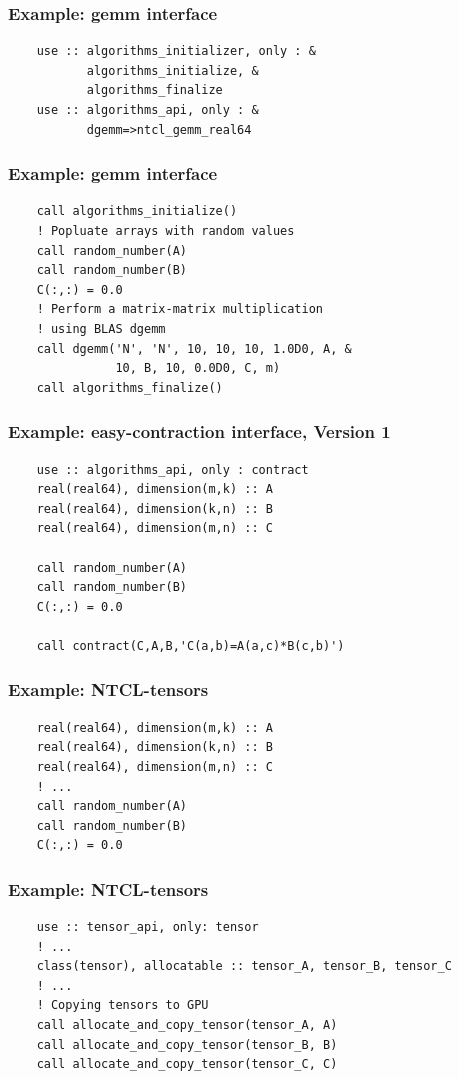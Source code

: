 \begin{frame}[fragile]
	\frametitle{Example: gemm interface}
	\begin{lstlisting}
    use :: algorithms_initializer, only : &
           algorithms_initialize, &
           algorithms_finalize
    use :: algorithms_api, only : &
           dgemm=>ntcl_gemm_real64
	\end{lstlisting}
\end{frame}

\begin{frame}[fragile]
	\frametitle{Example: gemm interface}
	\begin{lstlisting}
    call algorithms_initialize()
    ! Popluate arrays with random values
    call random_number(A)
    call random_number(B)
    C(:,:) = 0.0
    ! Perform a matrix-matrix multiplication 
    ! using BLAS dgemm
    call dgemm('N', 'N', 10, 10, 10, 1.0D0, A, &
               10, B, 10, 0.0D0, C, m)
    call algorithms_finalize()
	\end{lstlisting}
\end{frame}

\begin{frame}[fragile]
	\frametitle{Example: easy-contraction interface, Version 1}
	\begin{lstlisting}
    use :: algorithms_api, only : contract
    real(real64), dimension(m,k) :: A
    real(real64), dimension(k,n) :: B
    real(real64), dimension(m,n) :: C

    call random_number(A)
    call random_number(B)
    C(:,:) = 0.0

    call contract(C,A,B,'C(a,b)=A(a,c)*B(c,b)')
	\end{lstlisting}
\end{frame}


\begin{frame}[fragile]
	\frametitle{Example: NTCL-tensors}
\begin{lstlisting}
    real(real64), dimension(m,k) :: A
    real(real64), dimension(k,n) :: B
    real(real64), dimension(m,n) :: C
    ! ...
    call random_number(A)
    call random_number(B)
    C(:,:) = 0.0
\end{lstlisting}
\end{frame}

\begin{frame}[fragile]
	\frametitle{Example: NTCL-tensors}
\begin{lstlisting}
    use :: tensor_api, only: tensor
    ! ...
    class(tensor), allocatable :: tensor_A, tensor_B, tensor_C
    ! ...
    ! Copying tensors to GPU
    call allocate_and_copy_tensor(tensor_A, A)
    call allocate_and_copy_tensor(tensor_B, B)
    call allocate_and_copy_tensor(tensor_C, C)
\end{lstlisting}
\end{frame}

